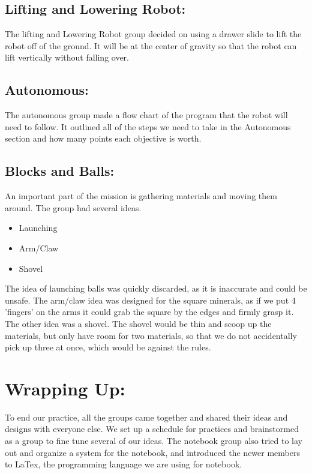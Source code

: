 \documentclass[12pt]{article}
\begin{document}
\subsection{Lifting and Lowering Robot:}
The lifting and Lowering Robot group decided on using a drawer slide to lift the robot off of the ground. It will be at the center of gravity so that the robot can lift vertically without falling over. 

\subsection{Autonomous:}
The autonomous group made a flow chart of the program that the robot will need to follow. It outlined all of the steps we need to take in the Autonomous section and how many points each objective is worth.

\subsection{Blocks and Balls:}
An important part of the mission is gathering materials and moving them around. The group had several ideas.
\begin{itemize}
	\item Launching 
	\item Arm/Claw
	\item Shovel
\end{itemize}
The idea of launching balls was quickly discarded, as it is inaccurate and could be unsafe. The arm/claw idea was designed for the square minerals, as if we put 4 'fingers' on the arms it could grab the square by the edges and firmly grasp it. The other idea was a shovel. The shovel would be thin and scoop up the materials, but only have room for two materials, so that we do not accidentally pick up three at once, which would be against the rules.

\section{Wrapping Up:}
To end our practice, all the groups came together and shared their ideas and designs with everyone else. We set up a schedule for practices and brainstormed as a group to fine tune several of our ideas. The notebook group also tried to lay out and organize a system for the notebook, and introduced the newer members to LaTex, the programming language we are using for notebook.

\newpage
\setcounter{section}{0}
\end{document}
